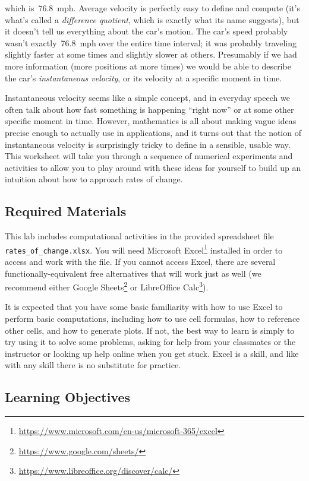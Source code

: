 which is~$76.8$~mph. Average velocity is perfectly easy to define and compute (it's what's called a \textit{difference quotient}, which is exactly what its name suggests), but it doesn't tell us everything about the car's motion. The car's speed probably wasn't exactly~76.8~mph over the entire time interval; it was probably traveling slightly faster at some times and slightly slower at others. Presumably if we had more information (more positions at more times) we would be able to describe the car's \textit{instantaneous velocity}, or its velocity at a specific moment in time.

Instantaneous velocity seems like a simple concept, and in everyday speech we often talk about how fast something is happening ``right now'' or at some other specific moment in time. However, mathematics is all about making vague ideas precise enough to actually use in applications, and it turns out that the notion of instantaneous velocity is surprisingly tricky to define in a sensible, usable way. This worksheet will take you through a sequence of numerical experiments and activities to allow you to play around with these ideas for yourself to build up an intuition about how to approach rates of change.

\subsection*{Required Materials}

This lab includes computational activities in the provided spreadsheet file \verb|rates_of_change.xlsx|. You will need Microsoft Excel\footnote{\url{https://www.microsoft.com/en-us/microsoft-365/excel}} installed in order to access and work with the file. If you cannot access Excel, there are several functionally-equivalent free alternatives that will work just as well (we recommend either Google Sheets\footnote{\url{https://www.google.com/sheets/}} or LibreOffice Calc\footnote{\url{https://www.libreoffice.org/discover/calc/}}).

It is expected that you have some basic familiarity with how to use Excel to perform basic computations, including how to use cell formulas, how to reference other cells, and how to generate plots. If not, the best way to learn is simply to try using it to solve some problems, asking for help from your classmates or the instructor or looking up help online when you get stuck. Excel is a skill, and like with any skill there is no substitute for practice.

\subsection*{Learning Objectives}

